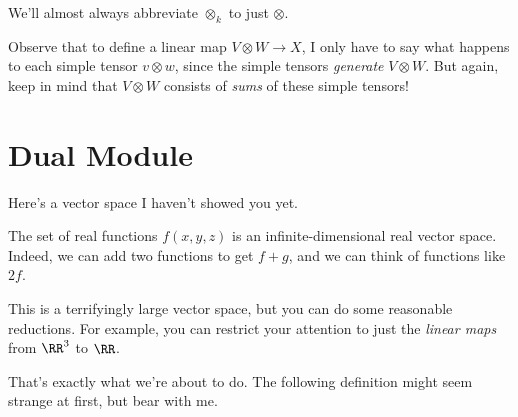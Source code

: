 %

\begin{abuse}
	We'll almost always abbreviate $\otimes_k$ to just $\otimes$.
\end{abuse}

\begin{remark}
	Observe that to define a linear map $V \otimes W \to X$,
	I only have to say what happens to each simple tensor $v \otimes w$,
	since the simple tensors \emph{generate} $V \otimes W$.
	But again, keep in mind that $V \otimes W$ consists of \emph{sums}
	of these simple tensors!
\end{remark}

\section{Dual Module}
Here's a vector space I haven't showed you yet.

\begin{example}
	The set of real functions $f(x,y,z)$ is an
	infinite-dimensional real vector space.
	Indeed, we can add two functions to get $f+g$,
	and we can think of functions like $2f$.
\end{example}
This is a terrifyingly large vector space,
but you can do some reasonable reductions.
For example, you can restrict your attention to just
the \emph{linear maps} from $\RR^3$ to $\RR$.

That's exactly what we're about to do.
The following definition might seem strange at first, but bear with me.

